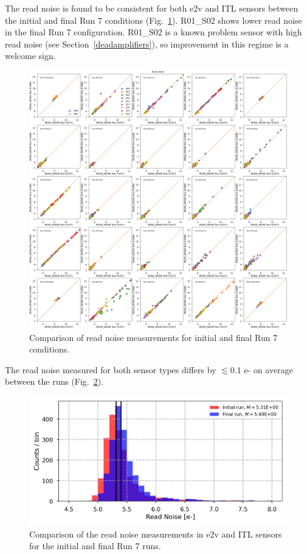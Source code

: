 The read noise is found to be consistent for both e2v and ITL sensors between the initial and final Run 7 conditions (Fig.~\ref{fig:finalChar-READNoise}). R01\_S02 shows lower read noise in the final Run 7 configuration. R01\_S02 is a known problem sensor with high read noise (see Section~\ref{deadamplifiers}), so improvement in this regime is a welcome sign. 

\begin{figure}[ht]
    \centering
    \includegraphics[width=0.7\linewidth]{figures/finalCharacterization/E1071_E1880_READ_NOISE_inset.png}
    \caption{Comparison of read noise measurements for initial and final Run 7 conditions.}
    \label{fig:finalChar-READNoise}
\end{figure}

The read noise measured for both sensor types differs by $\lesssim 0.1$ e- on average between the runs (Fig.~\ref{fig:finalChar:ReadNoiseByManu}).

\begin{figure}[ht]
    \centering
    \includegraphics[width=0.7\linewidth]{figures/finalCharacterization/ReadNoiseComp.jpg}
    \caption{Comparison of the read noise measurements in e2v and ITL sensors for the initial and final Run 7 runs.}
    \label{fig:finalChar:ReadNoiseByManu}
\end{figure}

